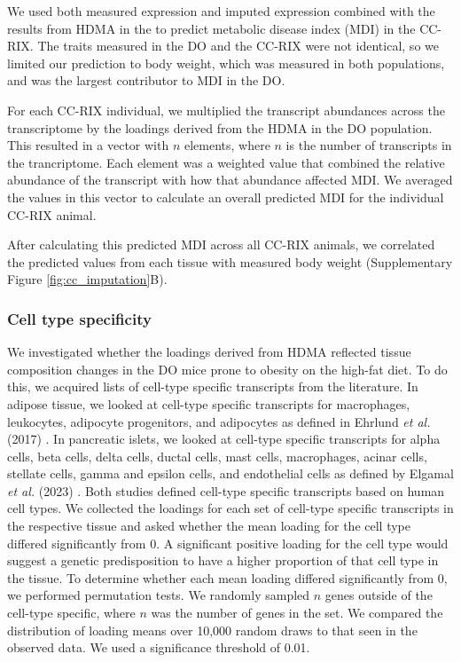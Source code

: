 \documentclass[
]{article}
\begin{document}
We used both measured expression and imputed expression combined with
the results from HDMA in the to predict metabolic disease index (MDI) in
the CC-RIX. The traits measured in the DO and the CC-RIX were not
identical, so we limited our prediction to body weight, which was
measured in both populations, and was the largest contributor to MDI in
the DO.

For each CC-RIX individual, we multiplied the transcript abundances
across the transcriptome by the loadings derived from the HDMA in the DO
population. This resulted in a vector with \(n\) elements, where \(n\)
is the number of transcripts in the trancriptome. Each element was a
weighted value that combined the relative abundance of the transcript
with how that abundance affected MDI. We averaged the values in this
vector to calculate an overall predicted MDI for the individual CC-RIX
animal.

After calculating this predicted MDI across all CC-RIX animals, we
correlated the predicted values from each tissue with measured body
weight (Supplementary Figure \ref{fig:cc_imputation}B).

\subsubsection{Cell type specificity}\label{cell-type-specificity}

We investigated whether the loadings derived from HDMA reflected tissue
composition changes in the DO mice prone to obesity on the high-fat
diet. To do this, we acquired lists of cell-type specific transcripts
from the literature. In adipose tissue, we looked at cell-type specific
transcripts for macrophages, leukocytes, adipocyte progenitors, and
adipocytes as defined in Ehrlund \textit{et al.} (2017)
\cite{pmid29087381}. In pancreatic islets, we looked at cell-type
specific transcripts for alpha cells, beta cells, delta cells, ductal
cells, mast cells, macrophages, acinar cells, stellate cells, gamma and
epsilon cells, and endothelial cells as defined by Elgamal
\textit{et al.} (2023) \cite{pmid36778506}. Both studies defined
cell-type specific transcripts based on human cell types. We collected
the loadings for each set of cell-type specific transcripts in the
respective tissue and asked whether the mean loading for the cell type
differed significantly from 0. A significant positive loading for the
cell type would suggest a genetic predisposition to have a higher
proportion of that cell type in the tissue. To determine whether each
mean loading differed significantly from 0, we performed permutation
tests. We randomly sampled \(n\) genes outside of the cell-type
specific, where \(n\) was the number of genes in the set. We compared
the distribution of loading means over 10,000 random draws to that seen
in the observed data. We used a significance threshold of 0.01.
\end{document}
